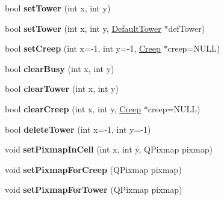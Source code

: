 \begin{DoxyCompactItemize}
\item 
\hypertarget{class_field_aa6072d5aa039fca99a6350f4aefaefc5}{}bool {\bfseries set\+Tower} (int x, int y)\label{class_field_aa6072d5aa039fca99a6350f4aefaefc5}

\item 
\hypertarget{class_field_aa17e083f23030f2e9fa38c44e1bf6c86}{}bool {\bfseries set\+Tower} (int x, int y, \hyperlink{class_default_tower}{Default\+Tower} $\ast$def\+Tower)\label{class_field_aa17e083f23030f2e9fa38c44e1bf6c86}

\item 
\hypertarget{class_field_a21373db1dbeeebb768fce2e35db8e8c5}{}bool {\bfseries set\+Creep} (int x=-\/1, int y=-\/1, \hyperlink{class_creep}{Creep} $\ast$creep=N\+U\+L\+L)\label{class_field_a21373db1dbeeebb768fce2e35db8e8c5}

\item 
\hypertarget{class_field_aa40566e1de3fa3d41b7a41bc18cfc867}{}bool {\bfseries clear\+Busy} (int x, int y)\label{class_field_aa40566e1de3fa3d41b7a41bc18cfc867}

\item 
\hypertarget{class_field_ad7d81fc2dcc1e1a1ef5758223e7312b1}{}bool {\bfseries clear\+Tower} (int x, int y)\label{class_field_ad7d81fc2dcc1e1a1ef5758223e7312b1}

\item 
\hypertarget{class_field_a9a8147e5ec6ed4ebbe6918daa8474c60}{}bool {\bfseries clear\+Creep} (int x, int y, \hyperlink{class_creep}{Creep} $\ast$creep=N\+U\+L\+L)\label{class_field_a9a8147e5ec6ed4ebbe6918daa8474c60}

\item 
\hypertarget{class_field_ad703021d1f7526b9ef2106f428978fa2}{}bool {\bfseries delete\+Tower} (int x=-\/1, int y=-\/1)\label{class_field_ad703021d1f7526b9ef2106f428978fa2}

\item 
\hypertarget{class_field_a54700c28e5595764e5f86d0e6e1592b9}{}void {\bfseries set\+Pixmap\+In\+Cell} (int x, int y, Q\+Pixmap pixmap)\label{class_field_a54700c28e5595764e5f86d0e6e1592b9}

\item 
\hypertarget{class_field_ab42fbe94607ffc3296586429d2e9caa6}{}void {\bfseries set\+Pixmap\+For\+Creep} (Q\+Pixmap pixmap)\label{class_field_ab42fbe94607ffc3296586429d2e9caa6}

\item 
\hypertarget{class_field_afe71649632bac1584574d0b960952a0c}{}void {\bfseries set\+Pixmap\+For\+Tower} (Q\+Pixmap pixmap)\label{class_field_afe71649632bac1584574d0b960952a0c}


\end{DoxyCompactItemize}
